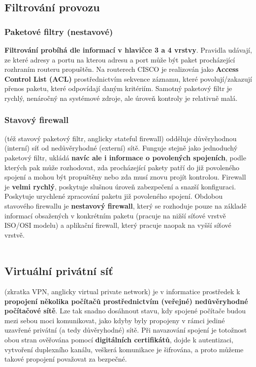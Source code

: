 \subsection{Filtrování provozu}
\subsubsection{Paketové filtry (nestavové)}
\textbf{Filtrování probíhá dle informací v hlavičce 3 a 4 vrstvy}. Pravidla udávají, ze které adresy a portu na kterou adresu a port může být paket procházející rozhraním routeru propuštěn. Na routerech CISCO je realizován jako \textbf{Access Control List (ACL)} prostřednictvím sekvence záznamu, které povolují/zakazují přenos paketu, které odpovídají daným kritériím. Samotný paketový filtr je rychlý, nenáročný na systémové zdroje, ale úroveň kontroly je relativně malá.

\subsubsection{Stavový firewall}
(též stavový paketový filtr, anglicky stateful firewall) odděluje důvěryhodnou (interní) síť od nedůvěryhodné (externí) sítě. Funguje stejně jako jednoduchý paketový filtr, ukládá \textbf{navíc ale i informace o povolených spojeních}, podle kterých pak může rozhodovat, zda procházející pakety patří do již povoleného spojení a mohou být propuštěny nebo zda musí znovu projít kontrolou. Firewall je \textbf{velmi rychlý}, poskytuje slušnou úroveň zabezpečení a snazší konfiguraci.  Poskytuje urychlené zpracování paketu již povoleného spojení. Obdobou stavového firewallu je \textbf{nestavový firewall}, který se rozhoduje pouze na základě informací obsažených v konkrétním paketu (pracuje na nižší síťové vrstvě ISO/OSI modelu) a aplikační firewall, který pracuje naopak na vyšší síťové vrstvě. 
\\\\
\noindent{}

\subsection{Virtuální privátní síť }
(zkratka VPN, anglicky virtual private network) je v informatice prostředek k \textbf{propojení několika počítačů prostřednictvím (veřejné) nedůvěryhodné počítačové sítě}. Lze tak snadno dosáhnout stavu, kdy spojené počítače budou mezi sebou moci komunikovat, jako kdyby byly propojeny v rámci jediné uzavřené privátní (a tedy důvěryhodné) sítě. Při navazování spojení je totožnost obou stran ověřována pomocí \textbf{digitálních certifikátů}, dojde k autentizaci, vytvoření duplexního kanálu, veškerá komunikace je šifrována, a proto můžeme takové propojení považovat za bezpečné.

